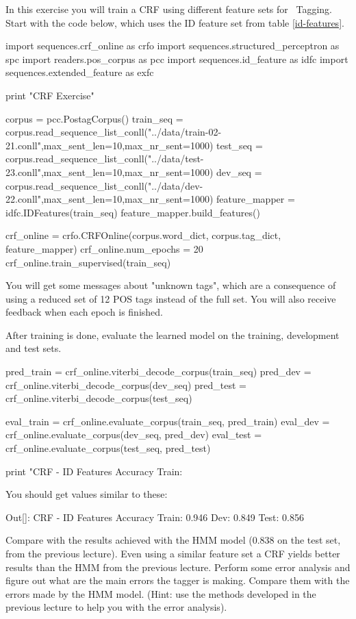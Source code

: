 \begin{exercise}\label{exer:crf1}
In this exercise you will train a CRF
using different feature sets for \pos\ Tagging. Start with the code below, which uses the ID feature set from table \ref{id-features}.
\begin{python}
import sequences.crf_online as crfo
import sequences.structured_perceptron as spc
import readers.pos_corpus as pcc
import sequences.id_feature as idfc
import sequences.extended_feature as exfc

print "CRF Exercise"

corpus = pcc.PostagCorpus()
train_seq = corpus.read_sequence_list_conll("../data/train-02-21.conll",max_sent_len=10,max_nr_sent=1000)
test_seq = corpus.read_sequence_list_conll("../data/test-23.conll",max_sent_len=10,max_nr_sent=1000)
dev_seq = corpus.read_sequence_list_conll("../data/dev-22.conll",max_sent_len=10,max_nr_sent=1000)
feature_mapper = idfc.IDFeatures(train_seq)
feature_mapper.build_features()

crf_online = crfo.CRFOnline(corpus.word_dict, corpus.tag_dict, feature_mapper)
crf_online.num_epochs = 20
crf_online.train_supervised(train_seq)
\end{python}
You will get some messages about "unknown tags", which are a consequence of using a reduced set of 12 POS tags instead of the full set. You will also receive feedback when each epoch is finished.

After training is done, evaluate the learned model on the training, development and test sets.
\begin{python}
pred_train = crf_online.viterbi_decode_corpus(train_seq)
pred_dev = crf_online.viterbi_decode_corpus(dev_seq)
pred_test = crf_online.viterbi_decode_corpus(test_seq)

eval_train = crf_online.evaluate_corpus(train_seq, pred_train)
eval_dev = crf_online.evaluate_corpus(dev_seq, pred_dev)
eval_test = crf_online.evaluate_corpus(test_seq, pred_test)

print "CRF - ID Features Accuracy Train: %
\end{python}

You should get values similar to these:
\begin{python}
Out[]: CRF - 
ID Features Accuracy Train: 0.946 Dev: 0.849 Test: 0.856
\end{python}
\end{exercise}

Compare with the results achieved with the HMM model (0.838 on the test set, from the previous lecture). Even using a similar feature set a CRF yields better
results than the HMM from the previous lecture. 
Perform some error analysis and figure out what are the main
errors the tagger is making. Compare them with the errors made
by the HMM model. (Hint: use the methods developed in the previous
lecture to help you with the error analysis).


